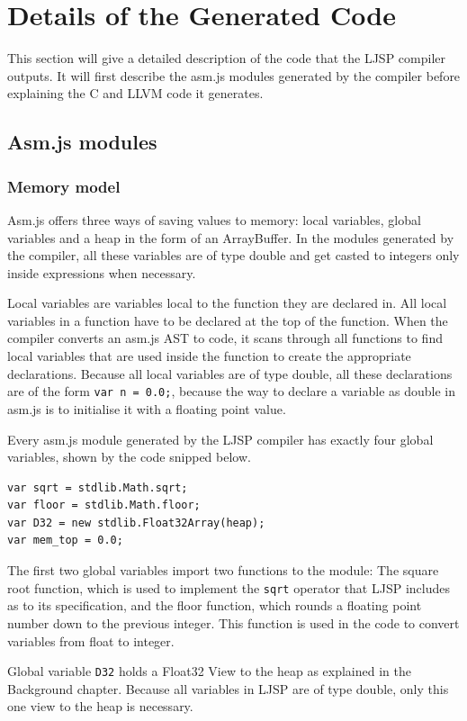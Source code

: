 \documentclass[11pt]{report}
\begin{document}
\section{Details of the Generated Code}
This section will give a detailed description of the code that the LJSP compiler outputs. It will first describe the asm.js modules generated by the compiler before explaining the C and LLVM code it generates.
\subsection{Asm.js modules}
\subsubsection{Memory model}
Asm.js offers three ways of saving values to memory: local variables, global variables and a heap in the form of an ArrayBuffer. In the modules generated by the compiler, all these variables are of type double and get casted to integers only inside expressions when necessary.

Local variables are variables local to the function they are declared in. All local variables in a function have to be declared at the top of the function. When the compiler converts an asm.js AST to code, it scans through all functions to find local variables that are used inside the function to create the appropriate declarations. Because all local variables are of type double, all these declarations are of the form \texttt{var n = 0.0;}, because the way to declare a variable as double in asm.js is to initialise it with a floating point value.

Every asm.js module generated by the LJSP compiler has exactly four global variables, shown by the code snipped below. 
\begin{lstlisting}
var sqrt = stdlib.Math.sqrt;
var floor = stdlib.Math.floor;
var D32 = new stdlib.Float32Array(heap);
var mem_top = 0.0;
\end{lstlisting}

The first two global variables import two functions to the module: The square root function, which is used to implement the \texttt{sqrt} operator that LJSP includes as to its specification, and the floor function, which rounds a floating point number down to the previous integer. This function is used in the code to convert variables from float to integer.

Global variable \texttt{D32} holds a Float32 View to the heap as explained in the Background chapter. Because all variables in LJSP are of type double, only this one view to the heap is necessary.
\end{document}
